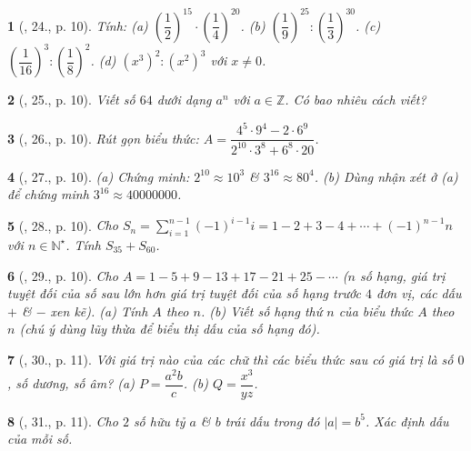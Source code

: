 \documentclass{article}
\newtheorem{baitoan}{}
\begin{document}
\begin{baitoan}[\cite{Binh_Toan_7_tap_1}, 24., p. 10]
	Tính: (a) $\left(\dfrac{1}{2}\right)^{15}\cdot\left(\dfrac{1}{4}\right)^{20}$. (b) $\left(\dfrac{1}{9}\right)^{25}:\left(\dfrac{1}{3}\right)^{30}$. (c) $\left(\dfrac{1}{16}\right)^3:\left(\dfrac{1}{8}\right)^2$. (d) $(x^3)^2:(x^2)^3$ với $x\ne 0$.
\end{baitoan}

\begin{baitoan}[\cite{Binh_Toan_7_tap_1}, 25., p. 10]
	Viết số $64$ dưới dạng $a^n$ với $a\in\mathbb{Z}$. Có bao nhiêu cách viết?
\end{baitoan}

\begin{baitoan}[\cite{Binh_Toan_7_tap_1}, 26., p. 10]
	Rút gọn biểu thức: $A = \dfrac{4^5\cdot 9^4 - 2\cdot 6^9}{2^{10}\cdot 3^8 + 6^8\cdot 20}$.
\end{baitoan}

\begin{baitoan}[\cite{Binh_Toan_7_tap_1}, 27., p. 10]
	(a) Chứng minh: $2^{10}\approx 10^3$ \& $3^{16}\approx 80^4$. (b) Dùng nhận xét ở (a) để chứng minh $3^{16}\approx 40000000$.	
\end{baitoan}

\begin{baitoan}[\cite{Binh_Toan_7_tap_1}, 28., p. 10]
	Cho $S_n = \sum_{i=1}^{n-1} (-1)^{i-1}i = 1 - 2 + 3 - 4 + \cdots + (-1)^{n-1}n$ với $n\in\mathbb{N}^\star$. Tính $S_{35} + S_{60}$.
\end{baitoan}

\begin{baitoan}[\cite{Binh_Toan_7_tap_1}, 29., p. 10]
	Cho $A = 1 - 5 + 9 - 13 + 17 - 21 + 25 - \cdots$ ($n$ số hạng, giá trị tuyệt đối của số sau lớn hơn giá trị tuyệt đối của số hạng trước $4$ đơn vị, các dấu $+$ \& $-$ xen kẽ). (a) Tính $A$ theo $n$. (b) Viết số hạng thứ $n$ của biểu thức $A$ theo $n$ (chú ý dùng lũy thừa để biểu thị dấu của số hạng đó).
\end{baitoan}

\begin{baitoan}[\cite{Binh_Toan_7_tap_1}, 30., p. 11]
	Với giá trị nào của các chữ thì các biểu thức sau có giá trị là số $0$, số dương, số âm? (a) $P = \dfrac{a^2b}{c}$. (b) $Q = \dfrac{x^3}{yz}$.
\end{baitoan}

\begin{baitoan}[\cite{Binh_Toan_7_tap_1}, 31., p. 11]
	Cho $2$ số hữu tỷ $a$ \& $b$ trái dấu trong đó $|a| = b^5$. Xác định dấu của mỗi số.
\end{baitoan}
\end{document}
